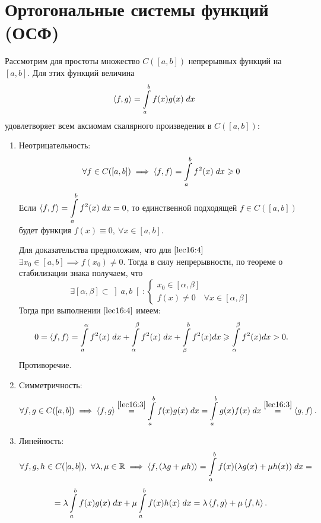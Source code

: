 \documentclass[../../main.tex]{subfiles}
\begin{document}
	 \section{Ортогональные системы функций (ОСФ)}
	 Рассмотрим для простоты множество $C(\left[a, b\right])$ непрерывных функций 
	 на $\left[a, b\right]$. Для этих функций величина
	   \begin{equation}
	 \label{lec16:3}
	 	 \left\langle f, g \right\rangle = \int \limits_a^b f(x)g(x)\; dx
	  \end{equation}
	  удовлетворяет всем аксиомам скалярного произведения в $C(\left[a, 
	  b\right])$:
	 \begin{enumerate}
	 \item Неотрицательность:
	 \begin{equation}
	 \label{lec16:4}
	 \forall f \in C(\left[a, b\right]) \implies \left\langle f, f \right\rangle = 
	 \int\limits_a^bf^2(x)\; 
	 dx \geqslant 0 
	 \end{equation}
	 Если
	 $\displaystyle \left\langle f, f \right\rangle = \int\limits_a^bf^2(x)\; dx = 0 $, то 
	 единственной  подходящей $f \in 
	 C(\left[a,
	  b\right]) $ будет функция $f(x) \equiv 0, \ \forall x \in \left[a, 
	  b\right]$.
	  
	 Для доказательства предположим, что для $\eqref{lec16:4}$ 
	 $\exists
	  x_0 \in \left[a, b\right] \implies f(x_0) \neq 0$. Тогда в силу 
	  непрерывности,
	   по теореме о стабилизации знака получаем, что \[\exists \left[\alpha, 
	   \beta 
	   \right]
	    \subset \left]a, b\right[ : \begin{cases}
	 x_0 \in \left[\alpha, \beta \right]\\
	 f(x) \neq 0 \quad \forall x \in \left[\alpha, \beta \right] 
	 \end{cases}\]
	 Тогда при выполнении $\eqref{lec16:4}$ имеем:
	 \[0 = \left\langle f, f \right\rangle = \int\limits_a^\alpha
	  f^2(x)\; dx + \int\limits_\alpha^\beta f^2(x) \; dx + \int\limits_\beta^b 
	  f^2(x)dx \geqslant \int\limits_\alpha^\beta f^2(x)dx  > 0.\]
	  Противоречие.
	 \item Cимметричность:
	 \[\forall f, g \in C(\left[a, b\right]) \implies \left\langle f, g \right\rangle
	  \stackrel{\eqref{lec16:3}}{=} \int\limits_a^b f(x)g(x)\; 
	  dx = \int\limits_a^b 
	  g(x)f(x)\; dx \stackrel{\eqref{lec16:3}}{=} \left\langle g, f \right\rangle.\]
	 \item Линейность:
	 \[\forall f, g, h \in C(\left[a, b\right]),\ \forall \lambda, \mu \in \mathbb{R} 
	 \implies
	  \left\langle f, (\lambda g + \mu h) \right\rangle = \int \limits_a^bf(x) (\lambda g(x) + \mu 
	  h(x)) 
	  \; dx =\] \[=
	   \lambda \int \limits_a^bf(x)g(x)\; dx + \mu \int \limits_a^bf(x)h(x)\; dx 
	   = \lambda\left\langle f, g \right\rangle + \mu\left\langle f, h \right\rangle.\]
\end{enumerate}
\end{document}
